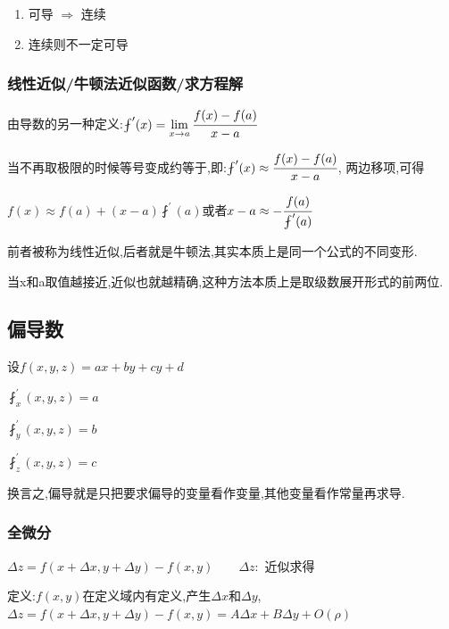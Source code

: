 \documentclass[UTF8,12pt]{ctexbook}
\newcommand{\limNormal}[1]{\lim\limits_{#1}}
\newcommand{\derivative}{^\prime}
\newcommand{\partialDerivative}[1]{^\prime_{#1}}
\newcommand{\fDerivative}[1]{\fint\derivative(#1)}
\newcommand{\defFunction}[1]{f(#1)}
\begin{document}
{{{\begin{enumerate}
    \item 可导 $\Rightarrow$ 连续

    \item 连续则不一定可导
  \end{enumerate}

  \subsubsection{线性近似/牛顿法近似函数/求方程解}{
    由导数的另一种定义:$\fDerivative{x} = \limNormal{x \to a}\cfrac{\defFunction{x} - \defFunction{a}}{x - a}$

    当不再取极限的时候等号变成约等于,即:$\fDerivative{x} \approx \cfrac{\defFunction{x} - \defFunction{a}}{x - a}$, 两边移项,可得

    $\defFunction{x} \approx \defFunction{a} + (x-a)\fDerivative{a}$或者$x - a \approx -\cfrac{\defFunction{a}}{\fDerivative{a}}$

    前者被称为线性近似,后者就是牛顿法,其实本质上是同一个公式的不同变形.

    当x和a取值越接近,近似也就越精确,这种方法本质上是取级数展开形式的前两位.

  }%

}%

\subsection{偏导数}{

  设$\defFunction{x,y,z} = ax + by + cy + d$

  $\fint\partialDerivative{x}(x,y,z) = a$

  $\fint\partialDerivative{y}(x,y,z) = b$

  $\fint\partialDerivative{z}(x,y,z) = c$

  换言之,偏导就是只把要求偏导的变量看作变量,其他变量看作常量再求导.

  \subsubsection{全微分}{

    $\Delta z = \defFunction{x + \Delta x,y + \Delta y} - \defFunction{x,y}\qquad\Delta z : $ 近似求得

    定义:$\defFunction{x,y}$在定义域内有定义,产生$\Delta x$和$\Delta y$,$\Delta z = \defFunction{x + \Delta x,y + \Delta y} - \defFunction{x,y} = A\Delta x + B\Delta y + O(\rho)$

}}}}
\end{document}
